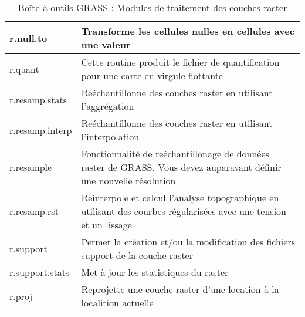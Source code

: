 \begin{table}[H]
\begin{tabular}{|p{4cm}|p{10cm}|}
  \hline r.null.to & Transforme les cellules nulles en cellules avec une valeur\\
  \hline r.quant & Cette routine produit le fichier de quantification pour une carte en virgule flottante \\
  \hline r.resamp.stats & Reéchantillonne des couches raster en utilisant l'aggrégation \\
  \hline r.resamp.interp & Reéchantillonne des couches raster en utilisant l'interpolation \\
  \hline r.resample & Fonctionnalité de reéchantillonage de données raster de GRASS. Vous devez auparavant définir une nouvelle résolution \\
  \hline r.resamp.rst & Reinterpole et calcul l'analyse topographique en utilisant des courbes régularisées avec une tension et un lissage \\
  \hline r.support & Permet la création et/ou la modification des fichiers support de la couche raster\\
  \hline r.support.stats & Met à jour les statistiques du raster \\
  \hline r.proj & Reprojette une couche raster d'une location à la localition actuelle \\
\hline
\end{tabular}
\caption{Boîte à outils GRASS : Modules de traitement des couches raster}
\end{table}

